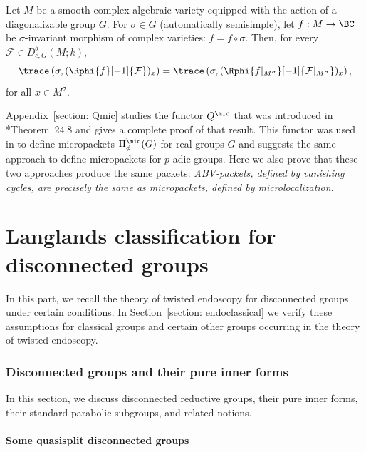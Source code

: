 \documentclass[11pt,letterpaper]{amsart}
\numberwithin{equation}{section}
\begin{document}
\begin{theorem}
Let $M$ be a smooth complex algebraic variety equipped with the action of a diagonalizable group $G$. 
For $\sigma\in G$ (automatically semisimple), let $f: M\to \BC$ be $\sigma$-invariant morphism of complex varieties: $f =f\circ \sigma$.
Then, for every $\mathcal{F}\in D^b_{c,G}(M;k)$,
\[
\trace\left(\sigma, (\Rphi{f}[-1]{ \mathcal{F}})_x \right)
=
\trace\left(\sigma, (\Rphi{f\vert_{M^\sigma}}[-1]{ \mathcal{F}\vert_{M^\sigma}})_x \right),
\]
for all $x\in M^\sigma$.
\end{theorem}



Appendix~\ref{section: Qmic} 
studies the functor $Q^\mic$ that was introduced in \cite{ABV92}*{Theorem~24.8} and gives a complete proof of that result. 
This functor was used in \cite{ABV92} to define micropackets $\Pi_\phi^\mic(G)$ for real groups $G$ and \cite{Vog93} suggests the same approach to define micropackets for $p$-adic groups. 
Here we also prove that these two approaches produce the same packets: {\it ABV-packets, defined by vanishing cycles, are precisely the same as micropackets, defined by microlocalization}. 







\part{Langlands classification for disconnected groups}\label{part: I Langlands}

In this part, we recall the theory of twisted endoscopy for disconnected groups under certain conditions. In Section~\ref{section: endoclassical} we verify these assumptions for classical groups and certain other groups occurring in the theory of twisted endoscopy.

\section{Disconnected groups and their pure inner forms}\label{section: disconnected groups and pure inner forms}

In this section, we discuss disconnected reductive groups, their pure inner forms, their standard parabolic subgroups, and related notions.

\subsection{Some quasisplit disconnected groups}\label{subsection: assumptions on groups}
\end{document}
